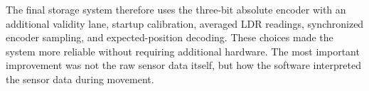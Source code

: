 The final storage system therefore uses the three-bit absolute encoder with an additional validity lane, startup calibration, averaged LDR readings, synchronized encoder sampling, and expected-position decoding. These choices made the system more reliable without requiring additional hardware. The most important improvement was not the raw sensor data itself, but how the software interpreted the sensor data during movement.




